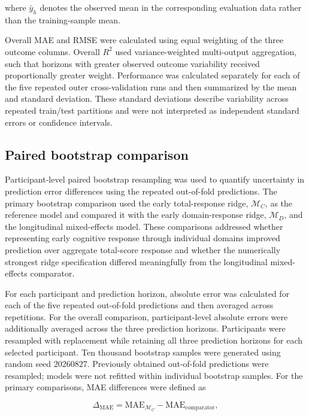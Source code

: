 \documentclass[11pt]{article}
\begin{document}
where $\bar{y}_{h}$ denotes the observed mean in the corresponding evaluation data rather
than the training-sample mean.

Overall MAE and RMSE were calculated using equal weighting of the three outcome columns.
Overall $R^2$ used variance-weighted multi-output aggregation, such that horizons with
greater observed outcome variability received proportionally greater weight. Performance was calculated separately for each of the five repeated outer cross-validation
runs and then summarized by the mean and standard deviation. These standard deviations
describe variability across repeated train/test partitions and were not interpreted as
independent standard errors or confidence intervals.


\subsection{Paired bootstrap comparison}

Participant-level paired bootstrap resampling was used to quantify uncertainty in prediction
error differences using the repeated out-of-fold predictions. The primary bootstrap comparison used the early total-response ridge,
$\mathcal{M}_{C}$, as the reference model and compared it with the early domain-response
ridge, $\mathcal{M}_{D}$, and the longitudinal mixed-effects model. These comparisons
addressed whether representing early cognitive response through individual domains improved
prediction over aggregate total-score response and whether the numerically strongest
ridge specification differed meaningfully from the longitudinal mixed-effects comparator.

For each participant and prediction horizon, absolute error was calculated for each of the
five repeated out-of-fold predictions and then averaged across repetitions. For the overall
comparison, participant-level absolute errors were additionally averaged across the three
prediction horizons. Participants were resampled with replacement while retaining all three prediction horizons
for each selected participant. Ten thousand bootstrap samples were generated using random
seed 20260827. Previously obtained out-of-fold predictions were resampled; models were not
refitted within individual bootstrap samples. For the primary comparisons, MAE differences were defined as

\begin{equation}
\Delta_{\mathrm{MAE}}
=
\mathrm{MAE}_{\mathcal{M}_{C}}
-
\mathrm{MAE}_{\mathrm{comparator}},
\end{equation}
\end{document}
